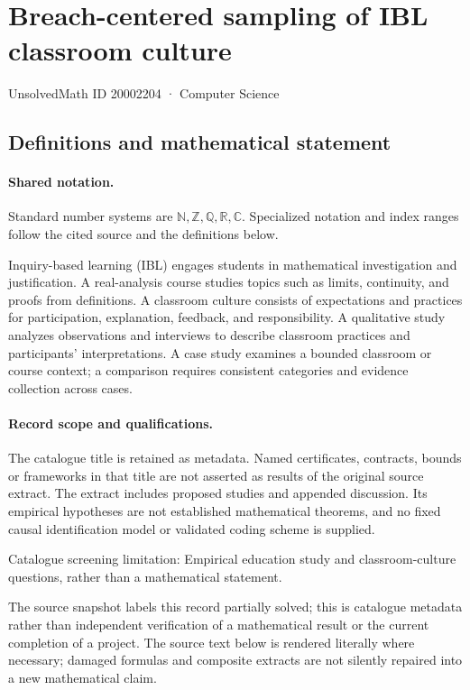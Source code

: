 \documentclass[11pt]{article}
\begin{document}
\setcounter{section}{20002203}
\section{Breach-centered sampling of IBL classroom culture}\label{20002204}
{\small\sffamily UnsolvedMath ID 20002204 · Computer Science}
\subsection{Definitions and mathematical statement}

\paragraph{Shared notation.}Standard number systems are $\mathbb N,\mathbb Z,\mathbb Q,\mathbb R,\mathbb C$. Specialized notation and index ranges follow the cited source and the definitions below.


Inquiry-based learning (IBL) engages students in mathematical investigation and justification. A real-analysis course studies topics such as limits, continuity, and proofs from definitions. A classroom culture consists of expectations and practices for participation, explanation, feedback, and responsibility. A qualitative study analyzes observations and interviews to describe classroom practices and participants' interpretations. A case study examines a bounded classroom or course context; a comparison requires consistent categories and evidence collection across cases.
\paragraph{Record scope and qualifications.}
The catalogue title is retained as metadata. Named certificates, contracts, bounds or frameworks in that title are not asserted as results of the original source extract.
The extract includes proposed studies and appended discussion. Its empirical hypotheses are not established mathematical theorems, and no fixed causal identification model or validated coding scheme is supplied.

Catalogue screening limitation: Empirical education study and classroom-culture questions, rather than a mathematical statement.

The source snapshot labels this record partially solved; this is catalogue metadata rather than independent verification of a mathematical result or the current completion of a project.
The source text below is rendered literally where necessary; damaged formulas and composite extracts are not silently repaired into a new mathematical claim.
\end{document}
